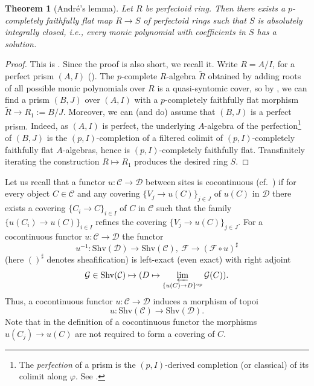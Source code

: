\documentclass{amsart}
\theoremstyle{plain}
\newtheorem{theorem}{Theorem}[subsection]
\theoremstyle{definition}
\newcommand{\red}[1]{{\color{black} #1}}
\newcommand{\blue}[1]{{\color{black}#1}}
\begin{document}
\begin{theorem}[Andr\'e's lemma]
  \label{sec:generalities-prisms-andres-lemma}
  Let $R$ be perfectoid ring. Then there exists a $p$-completely faithfully flat map $R\to S$ of perfectoid rings such that $S$ is absolutely integrally closed, i.e., every monic polynomial with coefficients in $S$ has a solution. 
\end{theorem}
\begin{proof}
 This is \cite[Theorem 7.12]{bhatt_scholze_prisms_and_prismatic_cohomology}. Since the proof is also short, we recall it. Write $R=A/I$, for a perfect prism $(A,I)$ (). The $p$-complete $R$-algebra $\tilde{R}$ obtained by adding roots of all possible monic polynomials over $R$ is a quasi-syntomic cover, so by , we can find a prism $(B,J)$ over $(A,I)$ with a $p$-completely faithfully flat morphism $\tilde{R} \to R_1:=B/J$. Moreover, we can (and do) assume that $(B,J)$ is a perfect prism. \red{Indeed, as $(A,I)$ is perfect, the underlying $A$-algebra of the perfection\footnote{The \textit{perfection} of a prism is the $(p,I)$-derived completion (or classical) of its colimit along $\varphi$. See \cite{bhatt_scholze_prisms_and_prismatic_cohomology}.} of $(B,J)$ is the $(p,I)$-completion of a filtered colimit of $(p,I)$-completely faithfully flat $A$-algebras, hence is $(p,I)$-completely faithfully flat.} Transfinitely iterating the construction $R\mapsto R_1$ produces the desired ring $S$. 
\end{proof}


 Let us recall that a functor $u\colon \mathcal{C}\to \mathcal{D}$ between sites is cocontinuous (cf.\ \cite[Tag 00XI]{stacks_project}) if \blue{for every object $C\in \mathcal{C}$ and any covering $\{V_j\to u(C)\}_{j\in J}$ of $u(C)$ in $\mathcal{D}$ there exists a covering $\{ C_i\to C\}_{i\in I}$ of $C$ in $\mathcal{C}$ such that the family $\{ u(C_i)\to u(C)\}_{i\in I}$ refines the covering $\{V_j\to u(C)\}_{j\in J}$}. For a cocontinuous functor
  $u\colon \mathcal{C}\to \mathcal{D}$ the functor
  $$
  u^{-1} \colon \mathrm{Shv}(\mathcal{D})\to \mathrm{Shv}(\mathcal{C}),\ \mathcal{F}\to (\mathcal{F}\circ u)^\sharp
  $$
  (here $()^\sharp$ denotes sheafification)
  is left-exact (even exact) with right adjoint
  $$
  \mathcal{G}\in \mathrm{Shv}(\mathcal{C})\mapsto (D\mapsto \varprojlim\limits_{\{ u(C)\to D\}^\mathrm{op}} \mathcal{G}(C)).
  $$
  Thus, a cocontinuous functor $u\colon \mathcal{C}\to \mathcal{D}$ induces a morphism of topoi
  $$
  u\colon \mathrm{Shv}(\mathcal{C})\to \mathrm{Shv}(\mathcal{D}).
  $$
  Note that in the definition of a cocontinuous functor the morphisms $u(C_j)\to u(C)$ are not required to form a covering of $C$.
  
\end{document}
